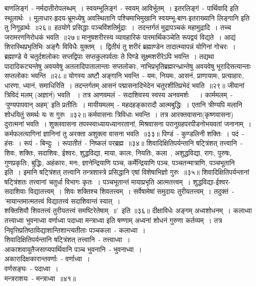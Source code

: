\indent  बाणलिङ्गं~- नर्मदातीरोपलब्धम्~। स्वयम्भूलिङ्गं~- स्वयम् आविर्भूतम्~। इतरलिङ्गं~- पार्थिवादि इति स्थूलार्थः~। मूलाधार-हृदय-भ्रूमध्येषु अवस्थितानि पश्चिमाभिमुखानि स्वयम्भू-बाण-इतराख्यानि लिङ्गानि इति तु निगूढार्थः~॥२६॥\footB\ 
\indent  हठयोगे प्रसिद्धाः पञ्चविंशतिर्मुद्राः~।\footB\ तदन्तर्गतं मुद्रापञ्चकं महामुद्रादि~। तच्च जरामरणनिरोधकं भवति~॥२७॥
\indent  मानुषशरीरस्य व्यावहारिकं पारमार्थिकञ्चेति रूपद्वयं विद्यते~। आद्यं शिरास्थिप्रभृतिभिः अङ्गैः विविधैः युक्तम्~।\footB\  द्वितीयं तु शरीरं ब्रह्माण्डेन तादात्म्यापन्नं योगिनां गोचरः~। ब्रह्माण्डे ये चतुर्दशलोकाः सप्तद्विपाः सप्तकुलपर्वताः ते पिण्डे सूक्ष्मशरीरेऽपि भवन्ति~। तद्यथा पादादिकट्यन्तेषु अवयवेषु अतलादिपातालान्ताः सप्तलोकाः, नाभिप्रभृतिब्रह्मरन्ध्रान्तेषु अवयवेषु  भूरादिसत्यान्ताः सप्तलोकाः भवन्ति~॥२८॥
\indent  योगस्य अष्टौ अङ्गानि भवन्ति~- यमः, नियमः, आसनं, प्राणायामः, प्रत्याहारः, धारणा, ध्यानं, समाधिरिति~।  तदन्तर्गतम् आसनं पद्मासनादिभेदेन चतुरशीतिप्रभेदं भवति~॥२९॥
\indent  जीवानां त्रिविदं मलम् (अज्ञानं) भवति \footB\ ।  तत्र आणवमलं~- सदाशिवस्य स्वस्य अनवमर्शः \footB\ ~। कार्ममलम्~- ‘पुण्यपापवान् अहम्’ इति प्रतीतिः~। मायीयमलम्~- महदहङ्कारादौ आत्मबुद्धिः~। एतानि त्रीण्यपि मलानि शोधयितुं समर्थः यः स गुरुः~॥३२॥
\indent  कर्मवासनाः त्रिविधाः भवन्ति~। तत्र आरक्तवासना(कृष्णवासना) दुरात्मनां भवति~। शुक्लवासना तपस्स्वाध्यायध्यानरतानां, मिश्रवासना परानुग्रहपरपीडनोभयवतां जनानाम्~। कर्मफलत्यागिनां ज्ञानिनां तु अरक्ता अशुक्ला वासना भवति~॥३३॥
\indent  पिण्डं~- कुण्डलिनी शक्तिः~। पदं~- हंसः~। रूपं~- बिन्दुः~। रूपातीतं~- निष्कलं परब्रह्म~॥३४॥
\indent  शिवादिक्षितिपर्यन्तानि षट्त्रिंशत् तत्त्वानि~- शिवः, शक्तिः, सदाशिवः, ईश्वरः, शुद्धविद्या, माया, कालः, नियतिः, कला~, अशुद्धविद्या, रागः, पुरुषः, गुणप्रकृतिः, बुद्धिः, अहंकारः, मनः, ज्ञानेन्द्रियाणि पञ्च, कर्मेन्द्रियाणि पञ्च,  पञ्चतन्मात्राणि, पञ्चभूतानि इति~। इमानि  षट्त्रिंशत् तत्त्वानि  तन्त्रशास्त्रे प्रसिद्धानि एषां विशेषाभिज्ञो गुरुः~॥३५॥
\indent   शिवादिक्षितिपर्यन्तानां षट्त्रिंशतः तत्त्वानां चतुर्धा विभागः कृतः~। पञ्चभूतान्तं मायाप्रभृति आत्मतत्त्वम्~। शुद्धविद्या-ईश्वर-सदाशिवाः विद्यातत्त्वम्~। शिवः शक्तिश्च शिवतत्त्वम्~। सर्वेषामेषां समुदायः तुरीयतत्त्वम्~। तदुक्तं~- \\'मायान्तमात्मतत्त्वं विद्यातत्त्वं सदाशिवान्तं स्यात्~।\\ शक्तिशिवौ शिवतत्त्वं तुरीयतत्त्वं समष्टिरेतेषाम्~॥'\footB\ इति  ॥३६॥
\indent  दीक्षाविधेः अङ्गम् अध्वशोधनम्~। कलाध्वा तत्त्वाध्वा भुवनाध्वा वर्णाध्वा पदाध्वा मन्त्राध्वा इति षण्णाम् अध्वनां शोधनं गुरुणा कर्तव्यम्~। तत्र निवृत्तिप्रतिष्ठाविद्याशान्तिशान्त्यतीताः पञ्चकला~- कलाध्वा~।\\ शिवादिक्षितिपर्यन्तानि षट्त्रिंशत् तत्त्वानि~- तत्त्वाध्वा~।\\ आकाशवायुतैजसाप्यपार्थिवानि पञ्च भुवनानि~- भुवनाध्वा~।\\ अकारादिक्षकारान्तवर्णाः~- वर्णाध्वा~।\\ वर्णसङ्घः~- पदाध्वा~।\\ मन्त्रराशयः~- मन्त्राध्वा~॥४१॥
